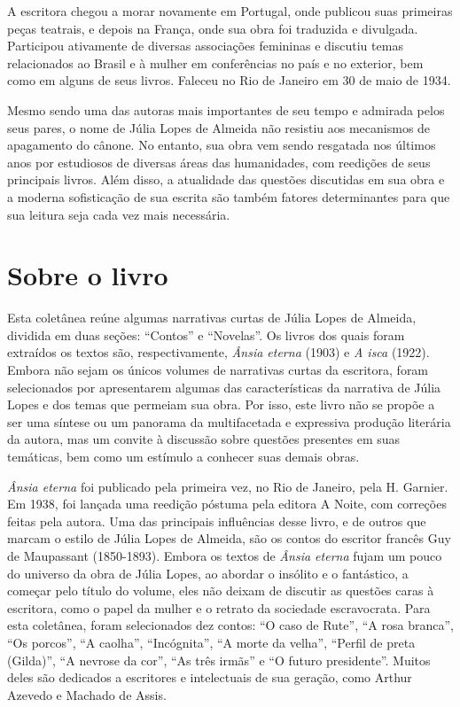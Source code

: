 A escritora chegou a morar novamente em Portugal, onde publicou suas
primeiras peças teatrais, e depois na França, onde sua obra foi
traduzida e divulgada. Participou ativamente de diversas associações
femininas e discutiu temas relacionados ao Brasil e à mulher em
conferências no país e no exterior, bem como em alguns de seus livros.
Faleceu no Rio de Janeiro em 30 de maio de 1934.

Mesmo sendo uma das autoras mais importantes de seu tempo e admirada
pelos seus pares, o nome de Júlia Lopes de Almeida não resistiu aos
mecanismos de apagamento do cânone. No entanto, sua obra vem sendo
resgatada nos últimos anos por estudiosos de diversas áreas das
humanidades, com reedições de seus principais livros. Além disso, a
atualidade das questões discutidas em sua obra e a moderna sofisticação
de sua escrita são também fatores determinantes para que sua leitura
seja cada vez mais necessária.

\section*{Sobre o livro}

Esta coletânea reúne algumas narrativas curtas de Júlia Lopes de
Almeida, dividida em duas seções: ``Contos'' e ``Novelas''. Os livros
dos quais foram extraídos os textos são, respectivamente, \emph{Ânsia
eterna} (1903) e \emph{A isca} (1922). Embora não sejam os únicos
volumes de narrativas curtas da escritora, foram selecionados por
apresentarem algumas das características da narrativa de Júlia Lopes e
dos temas que permeiam sua obra. Por isso, este livro não se propõe a
ser uma síntese ou um panorama da multifacetada e expressiva produção
literária da autora, mas um convite à discussão sobre questões presentes
em suas temáticas, bem como um estímulo a conhecer suas demais obras.

\emph{Ânsia eterna} foi publicado pela primeira vez, no Rio de Janeiro,
pela H. Garnier. Em 1938, foi lançada uma reedição póstuma pela editora
A Noite, com correções feitas pela autora. Uma das principais
influências desse livro, e de outros que marcam o estilo de Júlia Lopes
de Almeida, são os contos do escritor francês Guy de Maupassant
(1850-1893). Embora os textos de \emph{Ânsia eterna} fujam um pouco do
universo da obra de Júlia Lopes, ao abordar o insólito e o fantástico, a
começar pelo título do volume, eles não deixam de discutir as questões
caras à escritora, como o papel da mulher e o retrato da sociedade
escravocrata. Para esta coletânea, foram selecionados dez contos: ``O
caso de Rute'', ``A rosa branca'', ``Os porcos'', ``A caolha'',
``Incógnita'', ``A morte da velha'', ``Perfil de preta (Gilda)'', ``A
nevrose da cor'', ``As três irmãs'' e ``O futuro presidente''. Muitos
deles são dedicados a escritores e intelectuais de sua geração, como
Arthur Azevedo e Machado de Assis.

